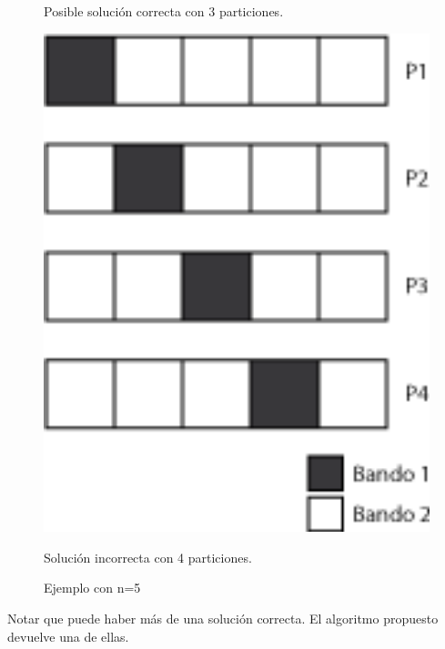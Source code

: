 \begin{figure}[H]
\begin{minipage}{0.25\textwidth}
  \caption*{\footnotesize Posible solución correcta con 3 particiones.}
  \label{fig:ej1-2}
\end{minipage}%
\hspace{0.05\textwidth}
\begin{minipage}{0.25\textwidth}   
  \centering
    \includegraphics[width=1\textwidth]{img/ejemplos/ej1-3.png} 
  \caption*{\footnotesize Solución incorrecta con 4 particiones.}
  \label{fig:ej1-3}
\end{minipage}%
\caption{Ejemplo con n=5}
\end{figure}

Notar que puede haber más de una solución correcta. El algoritmo propuesto devuelve una de ellas.

